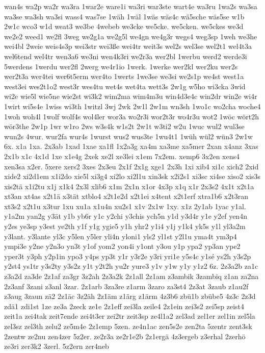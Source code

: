 {wan4s
wa2p
wa2r
wa3ra
1war2e
ware1i
wa3ri
war3ste
wart4e
wa3ru
1wa2s
wa3sa
wa3se
wa3sh
wa3si
wass4
was7se
1wäh
1wäl
1wäs
wäs4c
wä5sche
wäs5se
w1b
2w1c
wco3
w1d
weat3
we3be
4webeb
we3cke
we5cke.
we5cken.
we5ckes
we3d
we2e2
weed1
we2fl
3weg
we2g1a
we2g5l
we4gn
we4g3r
wegs4
weg3sp
1weh
we3he
wei4bl
2weie
weis4s3p
wei3str
wei3ße
wei4tr
weit3s
wel2s
wel3se
wel2t1
wel4t3a
wel6tend
wel4tr
wen3a6
we3ni
wen4k3ri
we2r3a
wer2bl
1werbu
werd2
werde3i
5werdens
1werdu
wer2fl
2werg
we4r1io
1werk.
1werke
wer2kl
wer2ku
wer2s
wer2t3a
wer4tei
wer6t5erm
wer4to
1werts
1we3se
we3si
we2s1p
we4st
west1a
west3ei
wes2t1o2
west3r
wes4tu
wet4s
wet4ta
wett3s
2w1g
w5ho
wi3cka
3wid
wi2e
wie5l
wie5ne
wie2st
wi3k2
wim2ma
wim4m3u
win4d3e4c
win2dr
win2e
wi4r
1wirt
wi5s4e
1wiss
wi3th
1witzl
3wj
2wk
2w1l
2w1m
wn3sh
1wo1c
wo2cha
woche4
1woh
woh4l
1wolf
wolf4s
wol4ler
wor3a
wo2r3i
wor2t3r
wo4r3u
wot2
1wöc
wört2h
wör3the
2w1p
1wr
w1ro
2ws
w3s4k
w1s2t
2w1t
w3ti2
w2u
1wuc
wul2
wul3se
wun2s
4wur.
wur2fa
wur4s
1wurst
wus2
wus3te
1wu4t1
1wüh
wül2
wün3
2w1w
6x.
x1a
1xa.
2x3ab
1xad
1xae
xa1fl
1x2a3g
xa4m
xa3me
xa5mer
2xan
x4anz
3xas
2x1b
x1c
4x1d
1xe
x1e4g
2xek
xe2l
xe3lei
x1em
7x2em.
xemp6
3x2en
xens4
xen3sa
x2er.
5xere
xers2
3xes
2x3eu
2x1f
2x1g
xge1
2x3h
1xi
xib4
xi1c
xich2
2xid
xide2
xi2d1em
x1i2do
xie5l
xi3g4
xi2lo
xi2l1u
xin3sk
x2i2s1
xi3sc
xi4se
xiso2
xis3s
xis2tä
x1i2tu
x1j
x1k4
2x3l
xlib6
x1m
2x1n
x1or
4x3p
x1q
x1r
2x3s2
4x1t
x2t1a
xt3an
xt4as
x2t1ä
x3tät
xtblo4
x2t1e2d
x2t1ei
x4tent
x2t1erf
xtra1b6
x2t3ran
xt3s2
x2t1u
x3tur
1xu
xu1a
x1u4n
xu2s1
x1v
2x1w
1xy.
x1z
2y1ab
1yac
y1al.
y1a2m
yan2g
y3ät
y1b
yb6r
y1c
y2chi
y3chis
ych5n
y1d
y3d4r
y1e
y2ef
yen4n
y2es
ye3sp
y3est
ye2th
y1f
y1g
ygie5
y1h
yhr2
y1i4
y1j
y1k4
yk5s
y1l
yl3a2m
y3lant.
y3lante
yl3c
y5len
y5ler
yli4n
yloni1
yls2
yl1st
y2l1u
yma4t
ym3p4
ympi3e
y2ne
y2n3o
yn3t
y1of
yom2
yon4i
y1ont
y3ou
y1p
ypa2
yp3an
ype2
yper3t
y3ph
y2p1in
ypo3
y4ps
yp3t
y1r
y3r2e
y3ri
yri1e
y5s4c
y1sé
ys2h
y3s2p
y2st4
ys1tr
y3s2ty
y3s2z
y1t
y2t2h
yu2r
yure3
y1v
y1w
y1y
y1z2
6z.
2z3a2b
za1c
z3a2d
za3de
2z1af
za3gr
3z2ah
2z3a2k
2z1all
2z1am
z3ambik
3zambiq
z1an
za2na
2z3anf
3zani
z3anl
3zar.
2z1arb
3za3re
z1arm
3zaro
za3st4
2z3at
3zaub
z1au2f
z3aug
3zaun
zä2
2z1äc
3z2äh
2z1äm
z1ärg
z1ärm
4z3b6
zbü1b
zbübe5
4z3c
2z3d
zdä1
zdi1st
1ze
ze3a
2zeck
ze1e
2z1eff
zei3la
zeile4
2z1ein
zei3s2
zei5sp
zeist4
zeit1a
zei4tak
zeit7ende
zei4t3er
zei2tr
zeit3sp
ze4l1a2
zel3ad
zel1er
zel1in
zel5la
zel3sz
zel3th
zelu2
ze5m4e
2z1emp
5zen.
ze4n1ac
zen5s2e
zen2ta
5zentr
zent3sk
2zentw
ze2nu
zen4zer
5z2er.
ze2r3a
ze2r1e2b
2z1ergä
4z3ergeb
z3erhal
2zerhö
ze3ri
zer3k2
3zerl.
5z2ern
zer4neb
}

